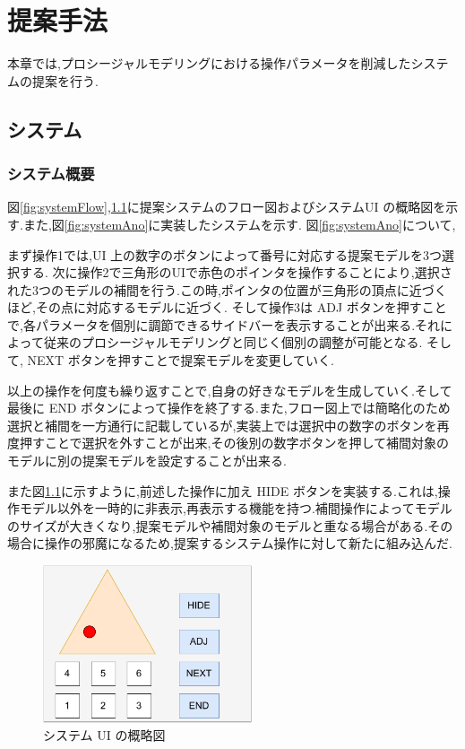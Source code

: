 \newpage

\chapter{提案手法}

  本章では,プロシージャルモデリングにおける操作パラメータを削減したシステムの提案を行う.

\section{システム}
\subsection{システム概要}
図\ref{fig:systemFlow},\ref{fig:systemUI}に提案システムのフロー図およびシステムUI の概略図を示す.また,図\ref{fig:systemAno}に実装したシステムを示す.
図\ref{fig:systemAno}について,


まず操作1では,UI 上の数字のボタンによって番号に対応する提案モデルを3つ選択する.
次に操作2で三角形のUIで赤色のポインタを操作することにより,選択された3つのモデルの補間を行う.この時,ポインタの位置が三角形の頂点に近づくほど,その点に対応するモデルに近づく.
そして操作3は ADJ ボタンを押すことで,各パラメータを個別に調節できるサイドバーを表示することが出来る.それによって従来のプロシージャルモデリングと同じく個別の調整が可能となる.
そして, NEXT ボタンを押すことで提案モデルを変更していく.


以上の操作を何度も繰り返すことで,自身の好きなモデルを生成していく.そして最後に END ボタンによって操作を終了する.また,フロー図上では簡略化のため選択と補間を一方通行に記載しているが,実装上では選択中の数字のボタンを再度押すことで選択を外すことが出来,その後別の数字ボタンを押して補間対象のモデルに別の提案モデルを設定することが出来る.
\clearpage

また図\ref{fig:systemUI}に示すように,前述した操作に加え HIDE ボタンを実装する.これは,操作モデル以外を一時的に非表示,再表示する機能を持つ.補間操作によってモデルのサイズが大きくなり,提案モデルや補間対象のモデルと重なる場合がある.その場合に操作の邪魔になるため,提案するシステム操作に対して新たに組み込んだ.

\begin{figure}[h]
    \centering
  \includegraphics[width=0.55\textwidth]{./imgs/systemUI.pdf}
  \caption{システム UI の概略図}\label{fig:systemUI}
\end{figure}

